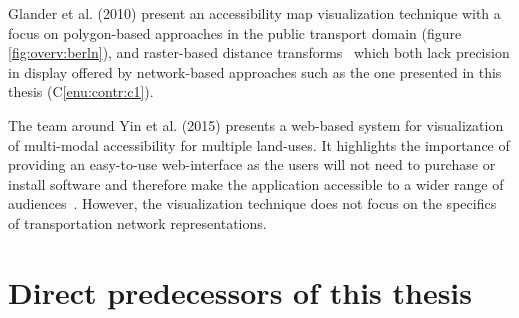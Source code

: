 

    Glander et al. (2010) present an accessibility map visualization technique
    with a focus on polygon-based approaches in the public transport domain
    \cite{Glander2010} (figure \ref{fig:overv:berln}), and raster-based distance
    transforms~\cite{Mueller2010} which both lack precision in display offered
    by network-based approaches such as the one presented in this thesis
    (C\ref{enu:contr:c1}).\par



    The team around Yin et al. (2015) presents a web-based system for
    visualization of multi-modal accessibility for multiple land-uses. It
    highlights the importance of providing an easy-to-use web-interface as the
    users will not need to purchase or install software and therefore make the
    application accessible to a wider range of audiences~\cite{Yin2015}.
    However, the visualization technique does not focus on the specifics of
    transportation network representations.\par

  \section{Direct predecessors of this thesis}
    \label{sec:overv:predc}

